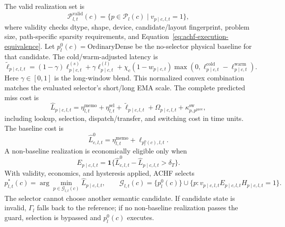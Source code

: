 \documentclass{article}
\begin{document}
The valid realization set is
\begin{equation}
\mathcal{P}^{\mathrm{valid}}_{l,t}(c)
=\{p\in\mathcal{P}_l(c)\mid v_{p\mid c,l,t}=1\},
\label{eq:achf-valid-realizations}
\end{equation}
where validity checks dtype, shape, device, candidate/layout fingerprint,
problem size, path-specific sparsity requirements, and
Equation~\eqref{eq:achf-execution-equivalence}. Let
$p_l^0(c)=\mathrm{OrdinaryDense}$ be the no-selector physical baseline for that
candidate. The cold/warm-adjusted latency is
\begin{equation}
\tilde\ell_{p\mid c,l,t}
=(1-\gamma)\ell_{p\mid c,t}^{(s)}+\gamma\ell_{p\mid c,t}^{(l)}
+\chi_c(1-w_{p\mid c,t})
\max(0,\ell_{p\mid c,t}^{\mathrm{cold}}-\ell_{p\mid c,t}^{\mathrm{warm}}).
\label{eq:ama-effective-latency}
\end{equation}
Here $\gamma\in[0,1]$ is the long-window blend. This normalized convex
combination matches the evaluated selector's short/long EMA scale.
The complete predicted miss cost is
\begin{equation}
\widehat L_{p\mid c,l,t}
=\eta^{\mathrm{memo}}_{l,t}+\eta^{\mathrm{sel}}_{l,t}
+\tilde\ell_{p\mid c,l,t}+\Omega_{p\mid c,l,t}
+\kappa^{\mathrm{sw}}_{p,p^{\mathrm{prev}}},
\label{eq:achf-complete-path-cost}
\end{equation}
including lookup, selection, dispatch/transfer, and switching cost in time
units. The baseline cost is
\begin{equation}
\widehat L^0_{c,l,t}
=\eta^{\mathrm{memo}}_{l,t}+\ell_{p_l^0(c),l,t}.
\label{eq:achf-physical-baseline-cost}
\end{equation}
A non-baseline realization is economically eligible only when
\begin{equation}
E_{p\mid c,l,t}
=\mathbf{1}\{\widehat L^0_{c,l,t}-\widehat L_{p\mid c,l,t}>\delta_T\}.
\label{eq:achf-selector-benefit}
\end{equation}
With validity, economics, and hysteresis applied, ACHF selects
\begin{equation}
p^*_{l,t}(c)=
\arg\min_{p\in\mathcal{G}_{l,t}(c)}\widehat L_{p\mid c,l,t},
\qquad
\mathcal{G}_{l,t}(c)=\{p_l^0(c)\}\cup
\{p:v_{p\mid c,l,t}E_{p\mid c,l,t}H_{p\mid c,l,t}=1\}.
\label{eq:achf-path-selector}
\end{equation}
The selector cannot choose another semantic candidate. If candidate state is
invalid, $\Gamma_l$ falls back to the reference; if no non-baseline realization
passes the guard, selection is bypassed and $p_l^0(c)$ executes.
\end{document}
